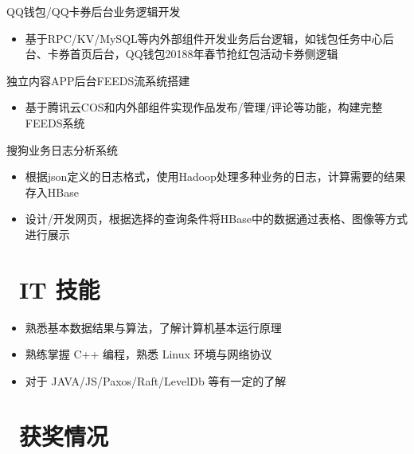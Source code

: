 \documentclass{resume}
\begin{document}
\begin{onehalfspacing}
QQ钱包/QQ卡券后台业务逻辑开发
\begin{itemize}
  \item 基于RPC/KV/MySQL等内外部组件开发业务后台逻辑，如钱包任务中心后台、卡券首页后台，QQ钱包20188年春节抢红包活动卡券侧逻辑
\end{itemize}

独立内容APP后台FEEDS流系统搭建
\begin{itemize}
  \item 基于腾讯云COS和内外部组件实现作品发布/管理/评论等功能，构建完整FEEDS系统
\end{itemize}
\end{onehalfspacing}
%
\begin{onehalfspacing}
搜狗业务日志分析系统
\begin{itemize}
  \item 根据json定义的日志格式，使用Hadoop处理多种业务的日志，计算需要的结果存入HBase
  \item 设计/开发网页，根据选择的查询条件将HBase中的数据通过表格、图像等方式进行展示
\end{itemize}
\end{onehalfspacing}


\section{\faCogs\ IT 技能}
\begin{itemize}[parsep=0.5ex]
  \item 熟悉基本数据结果与算法，了解计算机基本运行原理
  \item 熟练掌握 C++ 编程，熟悉 Linux 环境与网络协议
  \item 对于 JAVA/JS/Paxos/Raft/LevelDb 等有一定的了解
\end{itemize}

\section{\faHeartO\ 获奖情况}


%
%
\end{document}
